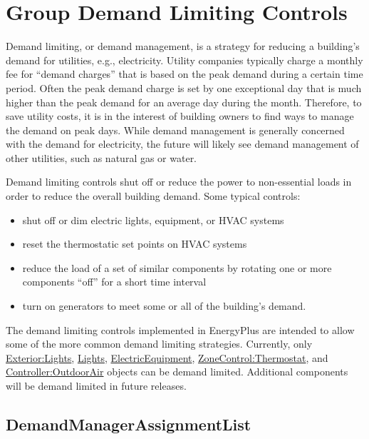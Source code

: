 \section{Group Demand Limiting Controls}\label{group-demand-limiting-controls}

Demand limiting, or demand management, is a strategy for reducing a building's demand for utilities, e.g., electricity. Utility companies typically charge a monthly fee for ``demand charges'' that is based on the peak demand during a certain time period. Often the peak demand charge is set by one exceptional day that is much higher than the peak demand for an average day during the month. Therefore, to save utility costs, it is in the interest of building owners to find ways to manage the demand on peak days. While demand management is generally concerned with the demand for electricity, the future will likely see demand management of other utilities, such as natural gas or water.

Demand limiting controls shut off or reduce the power to non-essential loads in order to reduce the overall building demand. Some typical controls:

\begin{itemize}
\item
  shut off or dim electric lights, equipment, or HVAC systems
\item
  reset the thermostatic set points on HVAC systems
\item
  reduce the load of a set of similar components by rotating one or more components ``off'' for a short time interval
\item
  turn on generators to meet some or all of the building's demand.
\end{itemize}

The demand limiting controls implemented in EnergyPlus are intended to allow some of the more common demand limiting strategies. Currently, only \hyperref[exteriorlights]{Exterior:Lights}, \hyperref[lights-000]{Lights}, \hyperref[electricequipment]{ElectricEquipment}, \hyperref[zonecontrolthermostat]{ZoneControl:Thermostat}, and \hyperref[controlleroutdoorair]{Controller:OutdoorAir} objects can be demand limited. Additional components will be demand limited in future releases.

\subsection{DemandManagerAssignmentList}\label{demandmanagerassignmentlist}


